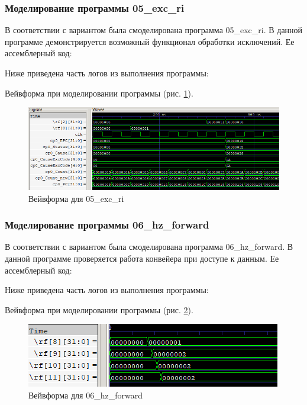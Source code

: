 \documentclass[a4paper,14pt]{article}
\begin{document}
	\subsubsection{Моделирование программы 05\_exc\_ri}
	
	В соответствии с вариантом была смоделирована программа  05\_exc\_ri.
	В данной программе демонстрируется возможный функционал обработки исключений.
	Ее ассемблерный код:
	
	{\small {}}
	
	Ниже приведена часть логов из выполнения программы:
	
	{\small {}}
	
	Вейвформа при моделировании программы (рис. \ref{fig:0405wvf}).
	
	\begin{figure}[H]
		\centering
		\includegraphics[width=0.95\linewidth]{images/04_05_wvf}
		\caption{Вейвформа для  05\_exc\_ri}
		\label{fig:0405wvf}
	\end{figure}
		
		
	\subsubsection{Моделирование программы 06\_hz\_forward}
	
	В соответствии с вариантом была смоделирована программа 06\_hz\_forward.
	В данной программе проверяется работа конвейера при доступе к данным.
	Ее ассемблерный код:
	
	{\small {}}
	
	Ниже приведена часть логов из выполнения программы:
	
	{\small {}}
	
	Вейвформа при моделировании программы (рис. \ref{fig:0406wvf}).
	
	\begin{figure}[H]
		\centering
		\includegraphics[width=0.7\linewidth]{images/04_06_wvf}
		\caption{Вейвформа для  06\_hz\_forward}
		\label{fig:0406wvf}
	\end{figure}
\end{document}
